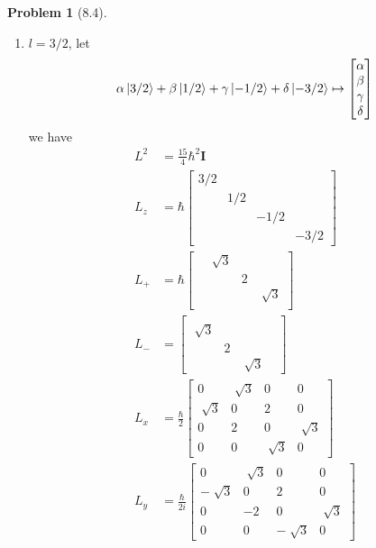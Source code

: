 \documentclass[twoside,11pt]{article}
\theoremstyle{definition}
\newtheorem{problem}{Problem}
\theoremstyle{remark}
\begin{document}
\begin{problem}[8.4]
\begin{enumerate}[label=Case \arabic*., leftmargin=*]
\item  $l=3/2$, let
\begin{align*}
    \alpha\ket{3/2} + \beta\ket{1/2} + \gamma\ket{-1/2} + \delta\ket{-3/2}
    \mapsto
    \begin{bmatrix}
        \alpha\\ \beta\\ \gamma\\ \delta
    \end{bmatrix}
\end{align*}
we have
\begin{align*}
    L^2 &= \frac{15}{4}\hbar^2\mathbf{I}\\
    L_z &= \hbar\begin{bmatrix}
        3/2 & & & \\
        & 1/2 & & \\
        & & -1/2 & \\ 
        & & & -3/2
    \end{bmatrix}\\
    L_+ &= \hbar\begin{bmatrix}
        & \sqrt[]{3} & & \\
        & & 2 & \\
        & & & \sqrt[]{3}\\
        & & & 
    \end{bmatrix}\\
    L_- &= \begin{bmatrix}
        & & & \\
        \sqrt[]{3} & & & \\
        & 2 & & \\ 
        & & \sqrt[]{3} & 
    \end{bmatrix}\\
    L_x &= \frac{\hbar}{2}\begin{bmatrix}
        0 & \sqrt[]{3} & 0 & 0\\
        \sqrt[]{3} & 0 & 2 & 0\\
        0 & 2 & 0 & \sqrt[]{3}\\
        0 & 0 & \sqrt[]{3} & 0
    \end{bmatrix}\\
    L_y &= \frac{\hbar}{2i}\begin{bmatrix}
        0 & \sqrt[]{3} & 0 & 0\\
        -\sqrt[]{3} & 0 & 2 & 0\\
        0 & -2 & 0 & \sqrt[]{3}\\
        0 & 0 & -\sqrt[]{3} & 0
    \end{bmatrix}
\end{align*}


\end{enumerate}
\end{problem}
\end{document}

